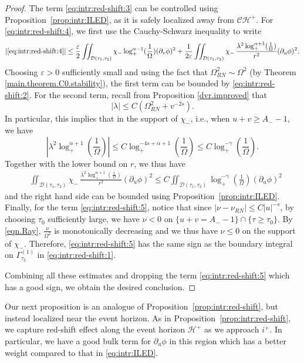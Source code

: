 \documentclass[10pt, reqno]{amsart}
\theoremstyle{definition}
\theoremstyle{remark}
\numberwithin{equation}{section}
\newcommand{\abs}[1]{\vert#1\vert}
\newcommand{\rd}{\partial}
\newcommand{\0}{\emptyset}
\newcommand{\alp}{\alpha}
\newcommand{\Gmm}{\Gamma}
\newcommand{\Omg}{\Omega}
\newcommand{\calC}{\mathcal C}
\newcommand{\calD}{\mathcal D}
\newcommand{\calH}{\mathcal H}
\newcommand{\f}{\frac}
\newcommand{\CH}{\calC \calH^{+}}		%
\begin{document}
\begin{proof}
The term \eqref{eq:intr:red-shift:3} can be controlled using Proposition~\ref{prop:intr:ILED}, as it is safely localized away from $\CH$. For \eqref{eq:intr:red-shift:4}, we first use the Cauchy-Schwarz inequality to write
\begin{equation*}
	\abs{\eqref{eq:intr:red-shift:4}}
	\leq \frac{\varepsilon}{2} \iint_{\calD(\tau_{1}, \tau_{2})} \chi_{-} \log_+^{\alp-1} (\frac{1}{\Omg}) (\rd_{v} \phi)^{2} + \frac{1}{2 \varepsilon} \iint_{\calD(\tau_{1}, \tau_{2})} \chi_{-} \, \frac{\lambda^2 \log_+^{\alp+1} (\frac{1}{\Omg})}{r^{2} } (\rd_{u} \phi)^{2} .
\end{equation*}
Choosing $\varepsilon > 0$ sufficiently small and using the fact that $\Omg_{RN}^2\sim \Omg^2$ (by Theorem \ref{main.theorem.C0.stability}), the first term can be bounded by \eqref{eq:intr:red-shift:2}. For the second term, recall from Proposition \ref{dvr.improved} that 
$$|\lambda|\leq C(\Omg^2_{RN}+v^{-2s}).$$
In particular, this implies that in the support of $\chi_-$, i.e., when $u+v\geq A_{-}-1$, we have
$$|\lambda^2 \log_+^{\alp+1} (\frac{1}{\Omg}) |\leq C\log_+^{-4s+\alp+1}(\f{1}{\Omg})\leq C\log_+^{-\gamma}(\f{1}{\Omg}).$$
Together with the lower bound on $r$, we thus have
\begin{equation*}
\begin{split}
&\iint_{\calD(\tau_{1}, \tau_{2})} \chi_{-} \, \frac{\lambda^2 \log_+^{\alp+1} (\frac{1}{\Omg})}{r^{2} } (\rd_{u} \phi)^{2}\leq C\iint_{\calD(\tau_{1}, \tau_{2})} \log_+^{-\gamma}(\f{1}{\Omg}) (\rd_{u} \phi)^{2}
\end{split}
\end{equation*}
and the right hand side can be bounded using Proposition~\ref{prop:intr:ILED}. Finally, for the term \eqref{eq:intr:red-shift:5}, notice that since $|\nu-\nu_{RN}|\leq C|u|^{-s}$, by choosing $\tau_0$ sufficiently large, we have $\nu<0$ on $\{u+v=A_{-}-1\}\cap\{\tau\geq \tau_0\}$. By \eqref{eqn.Ray}, $\f{\nu}{\Omg^2}$ is monotonically decreasing and we thus have $\nu\leq 0$ on the support of $\chi_-$. Therefore, \eqref{eq:intr:red-shift:5} has the same sign as the boundary integral on $\Gmm^{(1)}_{\tau_{2}}$ in \eqref{eq:intr:red-shift:1}. 

Combining all these estimates and dropping the term \eqref{eq:intr:red-shift:5} which has a good sign, we obtain the desired conclusion. \qedhere
\end{proof}

Our next proposition is an analogue of Proposition~\ref{prop:intr:red-shift}, but instead localized near the event horizon. As in Proposition~\ref{prop:intr:red-shift}, we capture red-shift effect along the event horizon $\calH^{+}$ as we approach $i^{+}$. In particular, we have a good bulk term for $\rd_u\phi$ in this region which has a better weight compared to that in \eqref{eq:intr:ILED}.
\end{document}
